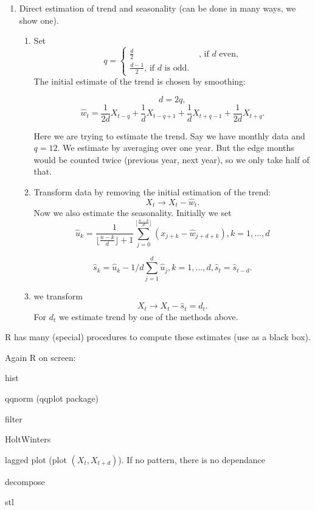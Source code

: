 \documentclass[12pt,a4paper, notitlepage]{book}
\theoremstyle{definition} %
\theoremstyle{plain} %
\begin{document}
\begin{enumerate}
\item Direct estimation of trend and seasonality (can be done in many ways, we show one).
\begin{enumerate}
\item Set 
\[ q = \begin{cases} \frac{d}{2} & \text{, if } d \text{ even,}  \\ \frac{d-1}{ 2} \text{, if } d  \text{ is odd. } \end{cases} \]
 The initial estimate of the trend is chosen by smoothing:

\[ d = 2q, \]
\[ \hat{w}_t = \frac{1}{2d}X_{t-q} + \frac{1}{d} X_{t-q+1} + \frac{1}{d}X_{t+q-1} + \frac{1}{2d}X_{t+q}. \]

Here we are trying to estimate the trend. Say we have monthly data and $q = 12$. We estimate by averaging over one year. But the edge months would be counted twice (previous year, next year), so we only take half of that. 

\item Transform data by removing the initial estimation of the trend: 
\[ X_t \rightarrow X_t - \hat{w}_t. \]
Now we also estimate the seasonality. Initially we set 
\[ \hat{u}_k = \frac{1}{ \lfloor\frac{n-k}{d}\rfloor + 1 } \sum_{j=0}^{\lfloor\frac{n-k}{d}\rfloor} (x_{j+k} - \hat{w}_{j+d+k}), k=1,\dots, d \]

\[ \hat{s}_k = \hat{u}_k - 1/d \sum_{j=1}^d \hat{u}_j, k=1, \dots, d, \hat{s}_t = \hat{s}_{t-d} . \]

\item we transform 
\[ X_t \rightarrow X_t - \hat{s}_t = d_t. \]
 For $d_t$ we estimate trend by one of the methods above. 

\end{enumerate}  
\end{enumerate}


R has many (special) procedures to compute these estimates (use as a black box). 


\vskip0.5cm

Again R on screen:

hist

qqnorm (qqplot package)

filter

HoltWinters

lagged plot (plot $(X_t, X_{t+d})$). If no pattern, there is no dependance

decompose

stl
\end{document}
